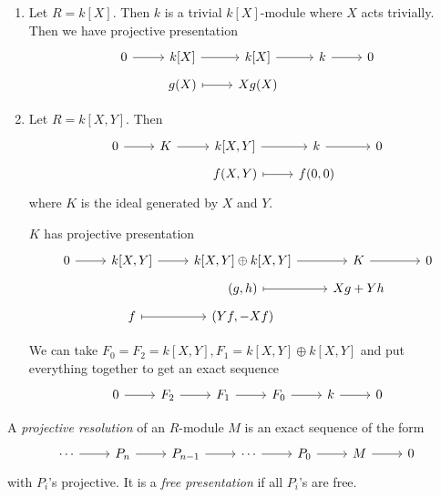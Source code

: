 \documentclass[a4paper]{article}
\begin{document}
\begin{eg}\leavevmode
  \begin{enumerate}
  \item Let \(R = k[X]\). Then \(k\) is a trivial \(k[X]\)-module where \(X\) acts trivially. Then we have projective presentation
    \[
      \begin{tikzcd}[row sep=tiny]
        0 \ar[r] & k[X] \ar[r] & k[X] \ar[r] & k \ar[r] & 0 \\
        & g(X) \ar[r, mapsto] & Xg(X)
      \end{tikzcd}
    \]
  \item Let \(R = k[X, Y]\). Then
    \[
      \begin{tikzcd}[row sep=tiny]
        0 \ar[r] & K \ar[r] & k[X, Y] \ar[r] & k \ar[r] & 0 \\
        & & f(X, Y) \ar[r, mapsto] & f(0, 0)
      \end{tikzcd}
    \]
    where \(K\) is the ideal generated by \(X\) and \(Y\).

    \(K\) has projective presentation
    \[
      \begin{tikzcd}[row sep=tiny]
        0 \ar[r] & k[X, Y] \ar[r] & k[X, Y] \oplus k[X, Y] \ar[r] & K \ar[r] & 0 \\
        & & (g, h) \ar[r, mapsto] & Xg + Yh \\
        & f \ar[r, mapsto] & (Yf, - Xf)
      \end{tikzcd}
    \]

    We can take \(F_0 = F_2 = k[X, Y], F_1 = k[X, Y] \oplus k[X, Y]\) and put everything together to get an exact sequence
    \[
      \begin{tikzcd}
        0 \ar[r] & F_2 \ar[r] & F_1 \ar[r] & F_0 \ar[r] & k \ar[r] & 0
      \end{tikzcd}
    \]
  \end{enumerate}
\end{eg}

\begin{definition}
  A \emph{projective resolution} of an \(R\)-module \(M\) is an exact sequence of the form
  \[
    \begin{tikzcd}
      \cdots \ar[r] & P_n \ar[r] & P_{n - 1} \ar[r] & \cdots \ar[r] & P_0 \ar[r] & M \ar[r] & 0
    \end{tikzcd}
  \]
  with \(P_i\)'s projective. It is a \emph{free presentation} if all \(P_i\)'s are free.
\end{definition}
\end{document}
